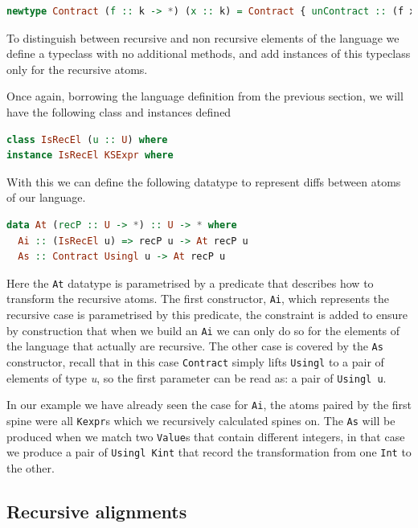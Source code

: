 \documentclass[11pt]{article}
\begin{document}
\begin{lstlisting}[language=haskell]
  newtype Contract (f :: k -> *) (x :: k) = Contract { unContract :: (f x , f x) }
\end{lstlisting}

To distinguish between recursive and non recursive elements of the language we 
define a typeclass with no additional methods, and add instances of this typeclass only for the recursive atoms.

Once again, borrowing the language definition from the previous section, we will have the following 
class and instances defined
\begin{lstlisting}[language=haskell]
class IsRecEl (u :: U) where
instance IsRecEl KSExpr where
\end{lstlisting}

With this we can define the following datatype to represent diffs between atoms of our language.
\begin{lstlisting}[language=haskell]
data At (recP :: U -> *) :: U -> * where
  Ai :: (IsRecEl u) => recP u -> At recP u
  As :: Contract Usingl u -> At recP u
\end{lstlisting}

Here the \texttt{At} datatype is parametrised by a predicate that describes how 
to transform the recursive atoms. 
The first constructor, \texttt{Ai}, which represents the recursive case is 
parametrised by this predicate, the constraint is added to ensure by construction 
that when we build an \texttt{Ai} we can only do so for the elements of the 
language that actually are recursive.
The other case is covered by the \texttt{As} constructor, recall that in this case \texttt{Contract} simply lifts 
\texttt{Usingl} to a pair of elements of type \emph{u}, so the first parameter 
can be read as: a pair of \texttt{Usingl u}.

In our example we have already seen the case for \texttt{Ai}, the atoms paired 
by the first spine were all \texttt{Kexpr}s which we recursively calculated spines on. 
The \texttt{As} will be produced when we match two \texttt{Value}s that contain 
different integers, in that case we produce a pair of \texttt{Usingl Kint} that record 
the transformation from one \texttt{Int} to the other.

\subsection{Recursive alignments}\label{recursive alignments}
\end{document}
